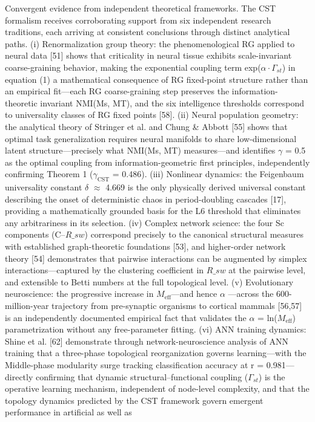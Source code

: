 \documentclass[a4paper,12pt]{article}
\begin{document}
Convergent evidence from independent theoretical frameworks.
The CST formalism receives corroborating support from six independent research traditions, each arriving at consistent conclusions through distinct analytical paths. (i) Renormalization group theory: the phenomenological RG applied to neural data [51] shows that criticality in neural tissue exhibits scale-invariant coarse-graining behavior, making the exponential coupling term
exp($\alpha \cdot \Gamma_{st}$) in equation (1) a mathematical consequence of RG fixed-point structure rather than an empirical fit---each RG coarse-graining step preserves the information-theoretic invariant NMI(Ms, MT), and the six intelligence thresholds correspond to universality classes of RG fixed points [58]. (ii) Neural population geometry: the analytical theory of Stringer et al. and
Chung \& Abbott [55] shows that optimal task generalization requires neural manifolds to share low-dimensional latent structure---precisely what NMI(Ms, MT) measures---and identifies  $\gamma$  = 0.5 as the optimal coupling from information-geometric first principles, independently confirming Theorem 1 ($\gamma_{\text{CST}}$ = 0.486). (iii) Nonlinear dynamics: the Feigenbaum universality constant  $\delta$ 
 $\approx$  4.669 is the only physically derived universal constant describing the onset of deterministic chaos in period-doubling cascades [17], providing a mathematically grounded basis for the L6 threshold that eliminates any arbitrariness in its selection. (iv) Complex network science: the four Sc components (C--$R\_{sw}$) correspond precisely to the canonical structural measures with
established graph-theoretic foundations [53], and higher-order network theory [54] demonstrates that pairwise interactions can be augmented by simplex interactions---captured by the clustering coefficient in $R\_{sw}$ at the pairwise level, and extensible to Betti numbers at the full topological level. (v) Evolutionary neuroscience: the progressive increase in $M_{\text{eff}}$---and hence
 $\alpha$ ---across the 600-million-year trajectory from pre-synaptic organisms to cortical mammals [56,57] is an independently documented empirical fact that validates the  $\alpha$  = ln($M_{\text{eff}}$) parametrization without any free-parameter fitting. (vi) ANN training dynamics: Shine et al. [62] demonstrate through network-neuroscience analysis of ANN training that a three-phase topological
reorganization governs learning---with the Middle-phase modularity surge tracking classification accuracy at r = 0.981---directly confirming that dynamic structural--functional coupling ($\Gamma_{st}$) is the operative learning mechanism, independent of node-level complexity, and that the topology dynamics predicted by the CST framework govern emergent performance in artificial as well as
\end{document}
